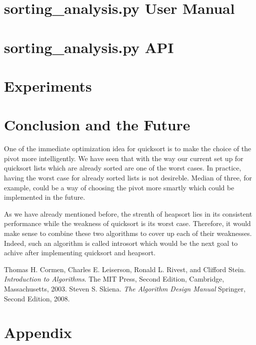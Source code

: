 \documentclass[refman]{scrartcl}
\begin{document}

\newpage
%

%

%

%
%
%
\newpage
\section{sorting\_analysis.py User Manual}

\section{sorting\_analysis.py API}

\section{Experiments}\label{sec:exp}

\section{Conclusion and the Future}\label{future}
One of the immediate optimization idea for quicksort is to make the choice of the pivot more intelligently. We have seen that with the way our current set up for quicksort lists which are already sorted are one of the worst cases. In practice, having the worst case for already sorted lists is not desireble. Median of three, for example, could be a way of choosing the pivot more smartly which could be implemented in the future.

As we have already mentioned before, the strenth of heapsort lies in its consistent performance while the weakness of quicksort is its worst case. Therefore, it would make sense to combine these two algorithms to cover up each of their weaknesses. Indeed, such an algorithm is called introsort which would be the next goal to achive after implementing quicksort and heapsort.
\newpage
\begin{thebibliography}{9}
        Thomas H. Cormen, Charles E. Leiserson, Ronald L. Rivest, and Clifford Stein. 
        \textit{Introduction to Algorithms}. 
        The MIT Press, Second Edition, Cambridge, Massachusetts, 2003.
        Steven S. Skiena.
        \textit{The Algorithm Design Manual}
        Springer, Second Edition, 2008.
%
\end{thebibliography}

\section{Appendix}

\end{document}
